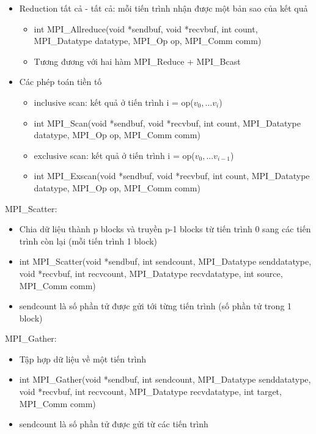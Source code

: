 \documentclass[14pt, a4paper]{article}
\numberwithin{equation}{section}
\numberwithin{figure}{section}
\numberwithin{dl}{section}
\numberwithin{md}{section}
\numberwithin{bd}{section}
\numberwithin{dn}{section}
\numberwithin{hq}{section}
\begin{document}
\begin{itemize}
    \item Reduction tất cả - tất cả: mỗi tiến trình nhận được một bản sao của kết quả
    \begin{itemize}
        \item int MPI\_Allreduce(void *sendbuf, void *recvbuf,
                                int count, MPI\_Datatype datatype,
                                MPI\_Op op, MPI\_Comm comm)

       \item Tương đương với hai hàm MPI\_Reduce + MPI\_Bcast
    \end{itemize}
    \item Các phép toán tiền tố
    \begin{itemize}
        \item inclusive scan: kết quả ở tiến trình i = op($v_0, ... v_i$) 
        \item int MPI\_Scan(void *sendbuf, void *recvbuf, int count,
                           MPI\_Datatype datatype, MPI\_Op op,
                           MPI\_Comm comm)
        \item exclusive scan: kết quả ở tiến trình i = op($v_0, ... v_{i-1}$) 
        \item int MPI\_Exscan(void *sendbuf, void *recvbuf, int count,
                              MPI\_Datatype datatype, MPI\_Op op,
                              MPI\_Comm comm)
       
    \end{itemize}
\end{itemize}

MPI\_Scatter:

\begin{itemize}
    \item Chia dữ liệu thành p blocks và truyền p-1 blocks từ tiến trình 0 sang các tiến trình còn lại (mỗi tiến trình 1 block)
    \item int MPI\_Scatter(void *sendbuf, int sendcount,
                           MPI\_Datatype senddatatype, void *recvbuf,
                           int recvcount, MPI\_Datatype recvdatatype,
                           int source, MPI\_Comm comm) 
    \item sendcount là số phần tử được gửi tới từng tiến trình (số phần tử trong 1 block)
\end{itemize}

MPI\_Gather:

\begin{itemize}
    \item Tập hợp dữ liệu về một tiến trình
    \item int MPI\_Gather(void *sendbuf, int sendcount,
                         MPI\_Datatype senddatatype, void *recvbuf,
                         int recvcount, MPI\_Datatype recvdatatype,
                         int target, MPI\_Comm comm)
    \item sendcount là số phần tử được gửi từ các tiến trình
\end{itemize}
\end{document}
